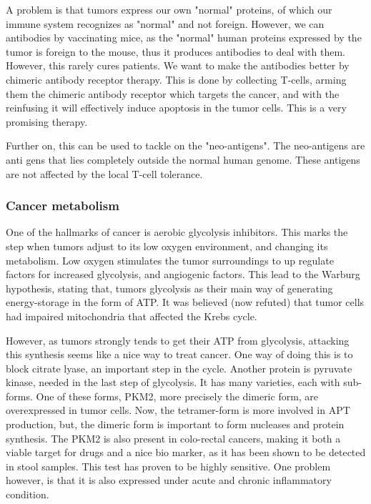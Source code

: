 \documentclass[12p]{article}
\begin{document}
A problem is that tumors express our own "normal" proteins, of which our immune system recognizes as "normal" and not foreign.
However, we can antibodies by vaccinating mice, as the "normal" human proteins expressed by the tumor is foreign to the mouse, thus it produces antibodies to deal with them.
However, this rarely cures patients.
We want to make the antibodies better by chimeric antibody receptor therapy.
This is done by collecting T-cells, arming them the chimeric antibody receptor which targets the cancer, and with the reinfusing it will effectively induce apoptosis in the tumor cells.
This is a very promising therapy.

Further on, this can be used to tackle on the "neo-antigens".
The neo-antigens are anti gens that lies completely outside the normal human genome.
These antigens are not affected by the local T-cell tolerance.

\subsubsection{Cancer metabolism}

One of the hallmarks of cancer is aerobic glycolysis inhibitors.
This marks the step when tumors adjust to its low oxygen environment, and changing its metabolism.
Low oxygen stimulates the tumor surroundings to up regulate factors for increased glycolysis, and angiogenic factors.
This lead to the Warburg hypothesis, stating that, tumors glycolysis as their main way of generating energy-storage in the form of ATP.
It was believed (now refuted) that tumor cells had impaired mitochondria that affected the Krebs cycle.

However, as tumors strongly tends to get their ATP from glycolysis, attacking this synthesis seems like a nice way to treat cancer.
One way of doing this is to block citrate lyase, an important step in the cycle.
Another protein is pyruvate kinase, needed in the last step of glycolysis.
It has many varieties, each with sub-forms.
One of these forms, PKM2, more precisely the dimeric form, are overexpressed in tumor cells.
Now, the tetramer-form is more involved in APT production, but, the dimeric form is important to form nucleases and protein synthesis.
The PKM2 is also present in colo-rectal cancers, making it both a viable target for drugs and a nice bio marker, as it has been shown to be detected in stool samples.
This test has proven to be highly sensitive.
One problem however, is that it is also expressed under acute and chronic inflammatory condition.
\end{document}
